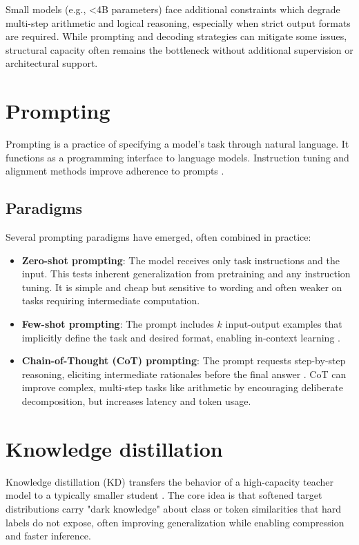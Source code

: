 Small models (e.g., <4B parameters) face additional constraints which degrade multi-step arithmetic and logical reasoning, especially when strict output formats are required. While prompting and decoding strategies can mitigate some issues, structural capacity often remains the bottleneck without additional supervision or architectural support.

\section{Prompting}
Prompting is a practice of specifying a model's task through natural language. It functions as a programming interface to language models. Instruction tuning and alignment methods improve adherence to prompts \cite{ouyang2022traininglanguagemodelsfollow}.

\subsection{Paradigms}
Several prompting paradigms have emerged, often combined in practice:
\begin{itemize}
    \item \textbf{Zero-shot prompting}: The model receives only task instructions and the input. This tests inherent generalization from pretraining and any instruction tuning. It is simple and cheap but sensitive to wording and often weaker on tasks requiring intermediate computation.
    \item \textbf{Few-shot prompting}: The prompt includes $k$ input-output examples that implicitly define the task and desired format, enabling in-context learning \cite{brown2020languagemodelsfewshotlearners}.
    \item \textbf{Chain-of-Thought (CoT) prompting}: The prompt requests step-by-step reasoning, eliciting intermediate rationales before the final answer \cite{wei2023chainofthoughtpromptingelicitsreasoning}. CoT can improve complex, multi-step tasks like arithmetic by encouraging deliberate decomposition, but increases latency and token usage.
\end{itemize}

\section{Knowledge distillation}
Knowledge distillation (KD) transfers the behavior of a high-capacity teacher model to a typically smaller student \cite{hinton2015distilling}. The core idea is that softened target distributions carry "dark knowledge" about class or token similarities that hard labels do not expose, often improving generalization while enabling compression and faster inference.

